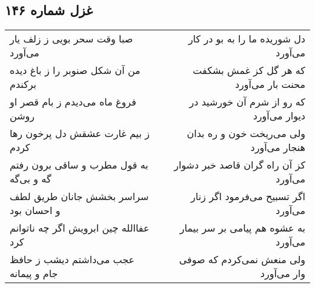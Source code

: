 \begin{center}
\section*{غزل شماره ۱۴۶}
\label{sec:sh146}
\begin{longtable}{l p{0.5cm} r}
صبا وقت سحر بویی ز زلف یار می‌آورد
&&
دل شوریده ما را به بو در کار می‌آورد
\\
من آن شکل صنوبر را ز باغ دیده برکندم
&&
که هر گل کز غمش بشکفت محنت بار می‌آورد
\\
فروغ ماه می‌دیدم ز بام قصر او روشن
&&
که رو از شرم آن خورشید در دیوار می‌آورد
\\
ز بیم غارت عشقش دل پرخون رها کردم
&&
ولی می‌ریخت خون و ره بدان هنجار می‌آورد
\\
به قول مطرب و ساقی برون رفتم گه و بی‌گه
&&
کز آن راه گران قاصد خبر دشوار می‌آورد
\\
سراسر بخشش جانان طریق لطف و احسان بود
&&
اگر تسبیح می‌فرمود اگر زنار می‌آورد
\\
عفاالله چین ابرویش اگر چه ناتوانم کرد
&&
به عشوه هم پیامی بر سر بیمار می‌آورد
\\
عجب می‌داشتم دیشب ز حافظ جام و پیمانه
&&
ولی منعش نمی‌کردم که صوفی وار می‌آورد
\\
\end{longtable}
\end{center}

